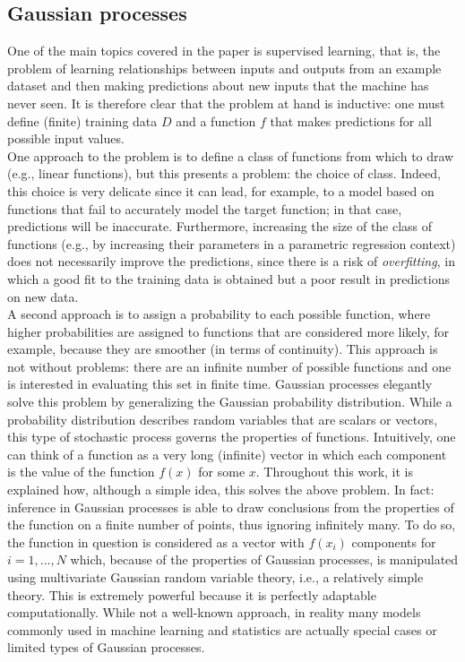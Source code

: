 \subsection{Gaussian processes}
One of the main topics covered in the paper is supervised learning, that is, the problem of learning relationships between inputs and outputs from an example dataset and then making predictions about new inputs that the machine has never seen. It is therefore clear that the problem at hand is inductive: one must define (finite) training data $D$ and a function $f$ that makes predictions for all possible input values.\\
One approach to the problem is to define a class of functions from which to draw (e.g., linear functions), but this presents a problem: the choice of class. Indeed, this choice is very delicate since it can lead, for example, to a model based on functions that fail to accurately model the target function; in that case, predictions will be inaccurate. Furthermore, increasing the size of the class of functions (e.g., by increasing their parameters in a parametric regression context) does not necessarily improve the predictions, since there is a risk of \textit{overfitting}, in which a good fit to the training data is obtained but a poor result in predictions on new data.\\
A second approach is to assign a probability to each possible function, where higher probabilities are assigned to functions that are considered more likely, for example, because they are smoother (in terms of continuity). This approach is not without problems: there are an infinite number of possible functions and one is interested in evaluating this set in finite time. Gaussian processes elegantly solve this problem by generalizing the Gaussian probability distribution. While a probability distribution describes random variables that are scalars or vectors, this type of stochastic process governs the properties of functions. Intuitively, one can think of a function as a very long (infinite) vector in which each component is the value of the function $f(x)$ for some $x$. Throughout this work, it is explained how, although a simple idea, this solves the above problem. In fact: inference in Gaussian processes is able to draw conclusions from the properties of the function on a finite number of points, thus ignoring infinitely many. To do so, the function in question is considered as a vector with $f(x_i)$ components for $i=1,...,N$ which, because of the properties of Gaussian processes, is manipulated using multivariate Gaussian random variable theory, i.e., a relatively simple theory. This is extremely powerful because it is perfectly adaptable computationally. While not a well-known approach, in reality many models commonly used in machine learning and statistics are actually special cases or limited types of Gaussian processes. 

